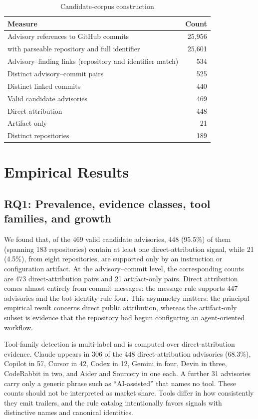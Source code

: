 \documentclass[smallextended,natbib]{svjour3}
\begin{document}
\begin{table}[t]
\caption{Candidate-corpus construction}
\label{tab:corpus}
\centering
\begin{tabular}{lr}
\toprule
Measure & Count \\
\midrule
Advisory references to GitHub commits & 25{,}956 \\
\quad with parseable repository and full identifier & 25{,}601 \\
Advisory--finding links (repository and identifier match) & 534 \\
Distinct advisory--commit pairs & 525 \\
Distinct linked commits & 440 \\
Valid candidate advisories & 469 \\
\quad Direct attribution & 448 \\
\quad Artifact only & 21 \\
Distinct repositories & 189 \\
\bottomrule
\end{tabular}
\end{table}
\section{Empirical Results}
\label{sec:results}


\subsection{RQ1: Prevalence, evidence classes, tool families, and growth}



We found that, of the 469 valid candidate advisories, 448 (95.5\%) of them (spanning 183 repositories) contain at
least one direct-attribution signal, while 21 (4.5\%), from eight
repositories, are supported only by an instruction or configuration artifact.
At the advisory--commit level, the corresponding counts are 473
direct-attribution pairs and 21 artifact-only pairs.  Direct attribution comes
almost entirely from commit messages: the message rule supports 447 advisories
and the bot-identity rule four.  This asymmetry matters:
the principal empirical result concerns direct public attribution, whereas the
artifact-only subset is evidence that the repository had begun configuring an
agent-oriented workflow.

Tool-family detection is multi-label and is computed over direct-attribution
evidence.  Claude appears in 306 of the 448 direct-attribution advisories
(68.3\%), Copilot in 57, Cursor in 42, Codex in 12, Gemini in four, Devin in
three, CodeRabbit in two, and Aider and Sourcery in one each.  A further 31
advisories carry only a generic phrase such as ``AI-assisted'' that names no
tool.  These counts should not be interpreted as market share.  Tools differ in
how consistently they emit trailers, and the rule catalog intentionally favors
signals with distinctive names and canonical identities.
\end{document}
